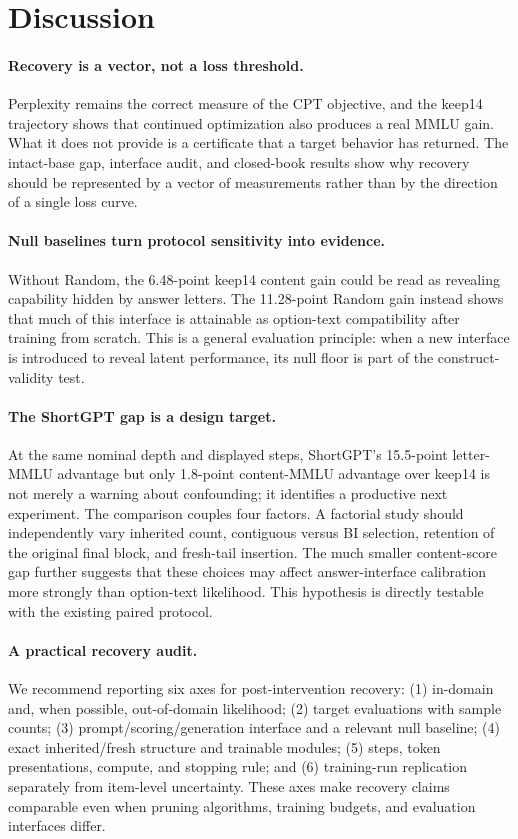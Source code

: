 \section{Discussion}
\label{sec:discussion}

\paragraph{Recovery is a vector, not a loss threshold.}
Perplexity remains the correct measure of the CPT objective, and the keep14
trajectory shows that continued optimization also produces a real MMLU gain.
What it does not provide is a certificate that a target behavior has returned.
The intact-base gap, interface audit, and closed-book results show why recovery
should be represented by a vector of measurements rather than by the direction
of a single loss curve.

\paragraph{Null baselines turn protocol sensitivity into evidence.}
Without Random, the 6.48-point keep14 content gain could be read as revealing
capability hidden by answer letters. The 11.28-point Random gain instead shows
that much of this interface is attainable as option-text compatibility after
training from scratch. This is a general evaluation principle: when a new
interface is introduced to reveal latent performance, its null floor is part
of the construct-validity test.

\paragraph{The ShortGPT gap is a design target.}
At the same nominal depth and displayed steps, ShortGPT's 15.5-point
letter-MMLU advantage but only 1.8-point content-MMLU advantage over keep14 is
not merely a warning about confounding; it identifies a productive next
experiment. The comparison couples four factors. A
factorial study should independently vary inherited count, contiguous versus
BI selection, retention of the original final block, and fresh-tail insertion.
The much smaller content-score gap further suggests that these choices
may affect answer-interface calibration more strongly than option-text
likelihood. This hypothesis is directly testable with the existing paired
protocol.

\paragraph{A practical recovery audit.}
We recommend reporting six axes for post-intervention recovery:
(1) in-domain and, when possible, out-of-domain likelihood;
(2) target evaluations with sample counts;
(3) prompt/scoring/generation interface and a relevant null baseline;
(4) exact inherited/fresh structure and trainable modules;
(5) steps, token presentations, compute, and stopping rule; and
(6) training-run replication separately from item-level uncertainty.
These axes make recovery claims comparable even when pruning algorithms,
training budgets, and evaluation interfaces differ.
